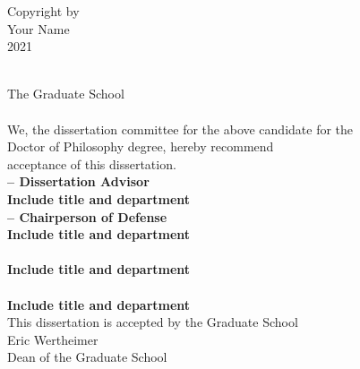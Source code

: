 \documentclass[
12pt, %
oneside, %
english, %
singlespacing, %
liststotoc, %
]{MastersDoctoralThesis} %
\begin{document}
\begin{singlespace}

\vspace*{\fill}
\begin{center}
Copyright by\\
Your Name\\
2021\\
\end{center}
\newpage
{}


\setcounter{page}{2}
\begin{center}
	\textbf{\univname}\\[0.5cm]
	The Graduate School\\[2cm]
	\textbf{\authorname}\\[2cm]
	We, the dissertation committee for the above candidate for the \\[0.5cm]
	Doctor of Philosophy degree, hereby recommend \\[0.5cm]
	acceptance of this dissertation. \\[1cm]
	
	\textbf{{\supname} -- Dissertation Advisor\\
	Include title and department}\\ [1cm]
	
	\textbf{{\examinerOname} -- Chairperson of Defense\\
	Include title and department}\\ [1cm]
	
	\textbf{{\examinerThname}\\
	Include title and department}\\ [1cm]
	
	\textbf{{\examinerJrname}\\
	Include title and department}\\ [1cm]
	
	This dissertation is accepted by the Graduate School\\ [2cm]
	Eric Wertheimer\\ [0.5cm]
	Dean of the Graduate School\\ [0.5cm]


\end{center}
\end{singlespace}
\end{document}
